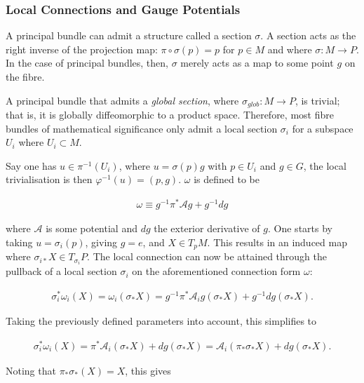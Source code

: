 \documentclass[fleqn, twocolumn, 10pt]{article}
\begin{document}

\subsubsection{Local Connections and Gauge Potentials}

A principal bundle can admit a structure called a section $\sigma$. A section acts as the right inverse of the projection map: $\pi \circ \sigma(p) = p$ for $p \in M$ and where $\sigma: M \to P$. In the case of principal bundles, then, $\sigma$ merely acts as a map to some point $g$ on the fibre.

A principal bundle that admits a \textit{global section}, where $\sigma_{glob}: M \to P$, is trivial; that is, it is globally diffeomorphic to a product space. Therefore, most fibre bundles of mathematical significance only admit a local section $\sigma_i$ for a subspace $U_i$ where $U_i \subset M$.     

Say one has $u \in \pi^{-1}(U_i)$, where $u = \sigma(p)g$ with $p \in U_i$ and $g \in G$, the local trivialisation is then $\varphi^{-1}(u) = (p,g)$. $\omega$ is defined to be

\begin{ceqn}
\begin{align*}
\omega \equiv g^{-1}\pi^\ast \mathcal{A}g + g^{-1}dg 
\end{align*}
\end{ceqn}
where $\mathcal{A}$ is some potential and $dg$ the exterior derivative of $g$. One starts by taking $u = \sigma_i(p)$, giving $g = e$, and $X \in T_pM$. This results in an induced map where $\sigma_{i\ast}X \in T_{\sigma_{i}}P$. The local connection can now be attained through the pullback of a local section $\sigma_i$ on the aforementioned connection form $\omega$:

\begin{ceqn}
\begin{align*}
\sigma^\ast_i\omega_i(X) = \omega_i(\sigma_\ast X) = g^{-1}\pi^\ast \mathcal{A}_ig(\sigma_\ast X) + g^{-1}dg(\sigma_\ast X). 
\end{align*}
\end{ceqn}
Taking the previously defined parameters into account, this simplifies to

\begin{ceqn}
\begin{align*}
\sigma^\ast_i\omega_i(X) = \pi^\ast \mathcal{A}_i(\sigma_\ast X) + dg(\sigma_\ast X) = \mathcal{A}_i(\pi_\ast\sigma_\ast X) + dg(\sigma_\ast X). 
\end{align*}
\end{ceqn}
Noting that $\pi_\ast\sigma_\ast(X) = X$, this gives 
\end{document}
